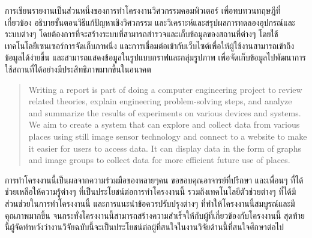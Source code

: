\maketitle
\makesignature

\ifproject
\begin{abstractTH}
การเขียนรายงานเป็นส่วนหนึ่งของการทำโครงงานวิศวกรรมคอมพิวเตอร์
เพื่อทบทวนทฤษฎีที่เกี่ยวข้อง อธิบายขั้นตอนวิธีแก้ปัญหาเชิงวิศวกรรม และวิเคราะห์และสรุปผลการทดลองอุปกรณ์และระบบต่างๆ
\enskip โดยต้องการที่จะสร้างระบบที่สามารถสำรวจและเก็บข้อมูลของสถานที่ต่างๆ โดยใช้เทคโนโลยีเซนเซอร์การจัดเก็บภาพนิ่ง
\enskip และการเชื่อมต่อเข้ากับเว็บไซต์เพื่อให้ผู้ใช้งานสามารถเข้าถึงข้อมูลได้ง่ายขึ้น และสามารถแสดงข้อมูลในรูปแบบกราฟและกลุ่มรูปภาพ
\enskip เพื่อจัดเก็บข้อมูลไปพัฒนาการใช้สถานที่ได้อย่างมีประสิทธิภาพมากขึ้นในอนาคต
\end{abstractTH}

\begin{abstract}
Writing a report is part of doing a computer engineering project to review related theories, 
\enskip explain engineering problem-solving steps, and analyze and summarize the results of experiments on various devices and systems.
\enskip We aim to create a system that can explore and collect data from various places using still image sensor technology and connect to a website to make it easier for users to access data.
\enskip It can display data in the form of graphs and image groups to collect data for more efficient future use of places.

\end{abstract}

\iffalse
\begin{dedication}
This document is dedicated to all Chiang Mai University students.

Dedication page is optional.
\end{dedication}
\fi %

\begin{acknowledgments}
การทำโครงงานนี้เป็นผลจากความร่วมมือของหลายๆคน ขอขอบคุณอาจารย์ที่ปรึกษา และเพื่อนๆ ที่ได้ช่วยเหลือให้ความรู้ต่างๆ ที่เป็นประโยชน์ต่อการทำโครงงานนี้
\enskip รวมถึงเทคโนโลยีตัวช่วยต่างๆ ที่ได้มีส่วนช่วยในการทำโครงงานนี้
\enskip และการแนะนำข้อควรปรับปรุงต่างๆ ที่ทำให้โครงงานนี้สมบูรณ์และมีคุณภาพมากขึ้น
\enskip จนกระทั่งโครงงานนี้สามารถสร้างความสำเร็จให้กับผู้ที่เกี่ยวข้องกับโครงงานนี้
\enskip สุดท้ายนี้ผู้จัดทำหวังว่างานวิจัยฉบับนี้จะเป็นประโยชน์ต่อผู้ที่สนใจในงานวิจัยด้านนี้ที่สนใจศึกษาต่อไป 

\end{acknowledgments}%
\fi %

\contentspage

\ifproject

\fi %



